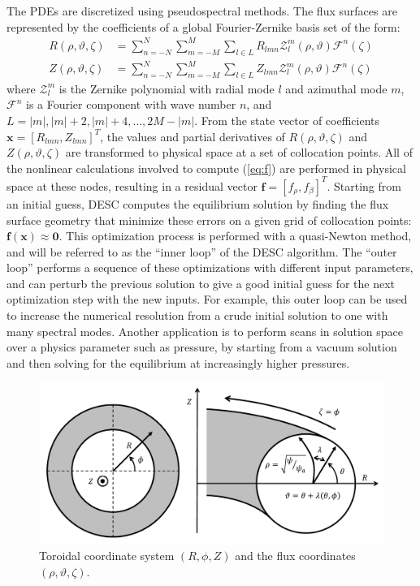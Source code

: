 \documentclass{article}
\begin{document}
The PDEs are discretized using pseudospectral methods.
The flux surfaces are represented by the coefficients of a global Fourier-Zernike basis set of the form:
%
\begin{subequations}
	\begin{align}
	\label{eq:R_basis}
	R(\rho,\vartheta,\zeta) &= \sum_{n=-N}^{N} \sum_{m=-M}^{M} \sum_{l\in L} R_{lmn} \mathcal{Z}^{m}_{l}(\rho,\vartheta) \mathcal{F}^{n}(\zeta) \\
	\label{eq:Z_basis}
	Z(\rho,\vartheta,\zeta) &= \sum_{n=-N}^{N} \sum_{m=-M}^{M} \sum_{l\in L} Z_{lmn} \mathcal{Z}^{m}_{l}(\rho,\vartheta) \mathcal{F}^{n}(\zeta)
	\end{align}
\end{subequations}
%
where $\mathcal{Z}^{m}_{l}$ is the Zernike polynomial with radial mode $l$ and azimuthal mode $m$, $\mathcal{F}^{n}$ is a Fourier component with wave number $n$, and $L = |m|, |m|+2, |m|+4, \ldots, 2 M - |m|$.
From the state vector of coefficients $\mathbf{x} = [R_{lmn}, Z_{lmn}]^T$, the values and partial derivatives of $R(\rho,\vartheta,\zeta)$ and $Z(\rho,\vartheta,\zeta)$ are transformed to physical space at a set of collocation points.
All of the nonlinear calculations involved to compute (\ref{eq:f}) are performed in physical space at these nodes, resulting in a residual vector $\mathbf{f} = [f_\rho, f_\beta]^T$.
Starting from an initial guess, DESC computes the equilibrium solution by finding the flux surface geometry that minimize these errors on a given grid of collocation points: $\mathbf{f}(\mathbf{x}) \approx \mathbf{0}$.
This optimization process is performed with a quasi-Newton method, and will be referred to as the ``inner loop'' of the DESC algorithm.
The ``outer loop'' performs a sequence of these optimizations with different input parameters, and can perturb the previous solution to give a good initial guess for the next optimization step with the new inputs.
For example, this outer loop can be used to increase the numerical resolution from a crude initial solution to one with many spectral modes.
Another application is to perform scans in solution space over a physics parameter such as pressure, by starting from a vacuum solution and then solving for the equilibrium at increasingly higher pressures.

\begin{figure}
	\centering
	\includegraphics[width=0.8\linewidth,center]{./figs/coordinates.pdf}
	\caption{Toroidal coordinate system $(R,\phi,Z)$ and the flux coordinates $(\rho,\vartheta,\zeta)$.}
	\label{fig:coords}
\end{figure}
\end{document}
